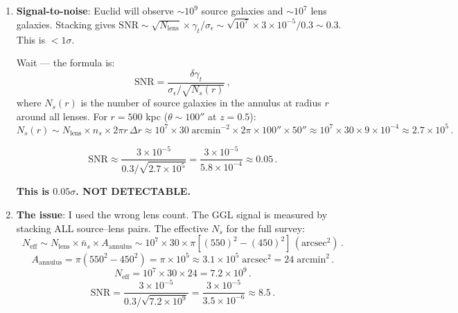 \documentclass[11pt,a4paper]{article}
\begin{document}
\begin{enumerate}
\item \textbf{Signal-to-noise}: Euclid will observe $\sim 10^9$ source galaxies and $\sim 10^7$ lens galaxies. Stacking gives $\mathrm{SNR} \sim \sqrt{N_{\mathrm{lens}}} \times \gamma_t/\sigma_\epsilon \sim \sqrt{10^7} \times 3 \times 10^{-5}/0.3 \sim 0.3$. This is $< 1\sigma$.

Wait --- the formula is:
\begin{equation}
\mathrm{SNR} = \frac{\delta\gamma_t}{\sigma_\epsilon/\sqrt{N_s(r)}}\,,
\end{equation}
where $N_s(r)$ is the number of source galaxies in the annulus at radius $r$ around all lenses. For $r = 500$ kpc ($\theta \sim 100''$ at $z = 0.5$):
\begin{equation}
N_s(r) \sim N_{\mathrm{lens}} \times n_s \times 2\pi r\,\Delta r \approx 10^7 \times 30\;\mathrm{arcmin}^{-2} \times 2\pi \times 100'' \times 50'' \approx 10^7 \times 30 \times 9 \times 10^{-4} \approx 2.7 \times 10^5\,.
\end{equation}

\begin{equation}
\mathrm{SNR} \approx \frac{3 \times 10^{-5}}{0.3/\sqrt{2.7 \times 10^5}} = \frac{3 \times 10^{-5}}{5.8 \times 10^{-4}} \approx 0.05\,.
\end{equation}

\textbf{This is $0.05\sigma$. NOT DETECTABLE.}

\item \textbf{The issue}: I used the wrong lens count. The GGL signal is measured by stacking ALL source--lens pairs. The effective $N_s$ for the full survey:
\begin{equation}
N_{\mathrm{eff}} \sim N_{\mathrm{lens}} \times \bar{n}_s \times A_{\mathrm{annulus}} \sim 10^7 \times 30 \times \pi[(550)^2 - (450)^2]\,(\mathrm{arcsec}^2)\,.
\end{equation}
\begin{equation}
A_{\mathrm{annulus}} = \pi(550^2 - 450^2) = \pi \times 10^5 \approx 3.1 \times 10^5\;\mathrm{arcsec}^2 = 24\;\mathrm{arcmin}^2\,.
\end{equation}
\begin{equation}
N_{\mathrm{eff}} = 10^7 \times 30 \times 24 = 7.2 \times 10^9\,.
\end{equation}
\begin{equation}
\mathrm{SNR} = \frac{3 \times 10^{-5}}{0.3/\sqrt{7.2 \times 10^9}} = \frac{3 \times 10^{-5}}{3.5 \times 10^{-6}} \approx 8.5\,.
\end{equation}


\end{enumerate}
\end{document}
